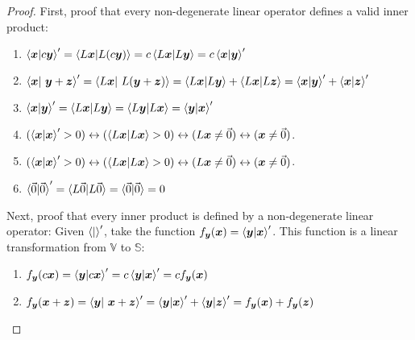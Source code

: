 \documentclass{article}
\newcommand{\B}[1]{\boldsymbol{#1}}
\theoremstyle{definition}
\theoremstyle{remark}
\begin{document}
\begin{proof}
  First, proof that every non-degenerate linear operator defines a valid inner product:
  \begin{enumerate}
    \item $\braket{\B{x}|c\B{y}}^\prime = \braket{ L \B{x} | L (c \B{y})} = c \braket{ L \B{x} | L \B{y}} = c\braket{ \B{x} | \B{y}}^\prime$
    \item $\braket{\B{x}| ~ \B{y} + \B{z}}^\prime = \braket{L \B{x}| ~ L (\B{y} + \B{z})} =  \braket{L \B{x}| L \B{y}} + \braket{L \B{x} |L\B{z}}=\braket{\B{x}| \B{y}}^\prime + \braket{\B{x}|\B{z}}^\prime$
    \item $\braket{\B{x}| \B{y}}^\prime = \braket{ L \B{x} | L \B{y}} = \braket{ L \B{y} | L \B{x}} =  \braket{\B{y}|\B{x}}^\prime$
    \item $(\braket{\B{x}| \B{x}}^\prime > 0 ) \leftrightarrow (\braket{ L \B{x}| L \B{x}} > 0) \leftrightarrow  (L \B{x} \neq \vec{0})  \leftrightarrow (\B{x} \neq \vec{0})$.
    \item $(\braket{\B{x}| \B{x}}^\prime > 0 ) \leftrightarrow (\braket{ L \B{x}| L \B{x}} > 0) \leftrightarrow  (L \B{x} \neq \vec{0})  \leftrightarrow (\B{x} \neq \vec{0})$.
    \item $\braket{\vec{0}|\vec{0}}^\prime = \braket{L \vec{0} | L \vec{0}} = \braket{\vec{0}|\vec{0}} = 0 $
  \end{enumerate}




  Next, proof that every inner product is defined by a non-degenerate linear operator:
  Given $\braket{|}^\prime$, take the function $f_{\B{y}}(\B{x}) = \braket{\B{y} | \B{x}}^\prime$.
  This function is a linear transformation from $\mathbb{V}$ to $\mathbb{S}$: 
  \begin{enumerate}
    \item  $f_{\B{y}}(c\B{x})= \braket{\B{y} | c\B{x}}^\prime = c \braket{\B{y} | \B{x}}^\prime = cf_{\B{y}}(\B{x})$
    \item $f_{\B{y}}(\B{x} + \B{z})  = \braket{\B{y}| ~ \B{x} + \B{z}}^\prime = \braket{\B{y}| \B{x}}^\prime + \braket{\B{y}| \B{z}}^\prime =  f_{\B{y}}(\B{x}) + f_{\B{y}}(\B{z}) $
  \end{enumerate}


\end{proof}
\end{document}
